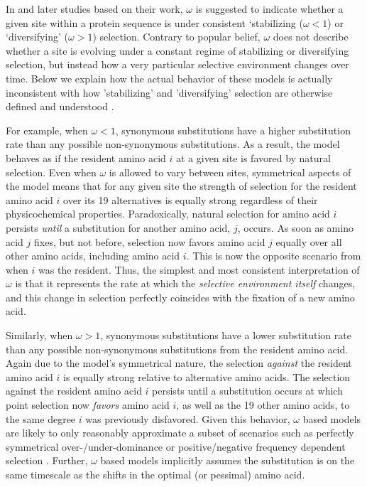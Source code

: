 \documentclass[12pt,letterpaper,fleqn]{article}
\newcommand{\PC}{physicochemical\xspace}
\begin{document}
In \citet{GoldmanAndYang1994,YangAndNielsen1998,NielsenAndYang1998} and later studies based on their work, $\omega$ is suggested to indicate whether a given site within a protein sequence is under consistent `stabilizing ($\omega < 1$) or `diversifying' ($\omega > 1$) selection.
Contrary to popular belief, $\omega$ does not describe whether a site is evolving under a constant regime of stabilizing or diversifying selection, but instead how a very particular selective environment changes over time.
Below we explain how the actual behavior of these models is actually inconsistent with how 'stabilizing' and 'diversifying' selection are otherwise defined and understood \citep[e.g.~see][]{Pellmyr2002}. %

For example, when $\omega < 1$, synonymous substitutions have a higher substitution rate than any possible non-synonymous substitutions.
As a result, the model behaves as if the resident amino acid $i$ at a given site is favored by natural selection.
Even when $\omega$ is allowed to vary between sites, symmetrical aspects  of the model means that for any given site the strength of selection for the resident amino acid $i$ over its 19 alternatives is equally strong regardless of their \PC properties.
Paradoxically, natural selection for amino acid $i$ persists \emph{until} a substitution for another amino acid, $j$, occurs.
As soon as amino acid $j$ fixes, but not before, selection now favors amino acid $j$ equally over all other amino acids, including amino acid $i$.
This is now the opposite scenario from when $i$ was the resident.
Thus, the simplest and most consistent interpretation of $\omega$ is that it represents the rate at which the \emph{selective environment itself} changes, and this change in selection perfectly coincides with the fixation of a new amino acid.

Similarly, when $\omega > 1$, synonymous substitutions have a lower substitution rate than any possible non-synonymous substitutions from the resident amino acid.
Again due to the model's symmetrical nature, the selection \emph{against} the resident amino acid $i$ is equally strong relative to alternative amino acids.
The selection against the resident amino acid $i$ persists until a substitution occurs at which point selection now \emph{favors} amino acid $i$, as well as the 19 other amino acids, to the same degree $i$ was previously disfavored.
Given this behavior, $\omega$ based models are likely to only reasonably approximate a subset of scenarios such as perfectly symmetrical over-/under-dominance or positive/negative frequency dependent selection \citep{HughesAndNei1988,Nowak2006}.
Further, $\omega$ based models implicitly assumes the substitution is on the same timescale as the shifts in the optimal (or pessimal) amino acid.
\end{document}
